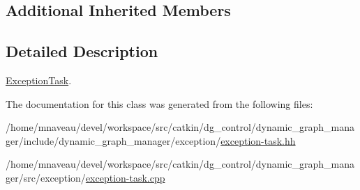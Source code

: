 \subsection*{Additional Inherited Members}


\subsection{Detailed Description}
\hyperlink{classdynamic__graph_1_1ExceptionTask}{Exception\+Task}. 

The documentation for this class was generated from the following files\+:\begin{DoxyCompactItemize}
\item 
/home/mnaveau/devel/workspace/src/catkin/dg\+\_\+control/dynamic\+\_\+graph\+\_\+manager/include/dynamic\+\_\+graph\+\_\+manager/exception/\hyperlink{exception-task_8hh}{exception-\/task.\+hh}\item 
/home/mnaveau/devel/workspace/src/catkin/dg\+\_\+control/dynamic\+\_\+graph\+\_\+manager/src/exception/\hyperlink{exception-task_8cpp}{exception-\/task.\+cpp}\end{DoxyCompactItemize}
